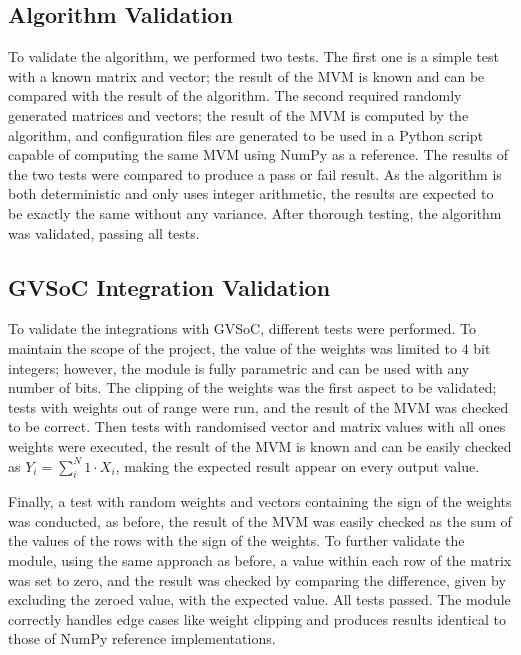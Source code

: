 \subsection{Algorithm Validation}\label{sec:alg_val}
To validate the algorithm, we performed two tests.
The first one is a simple test with a known matrix and vector; the result of the MVM is known and can be compared with the result of the algorithm.
The second required randomly generated matrices and vectors; the result of the MVM is computed by the algorithm, and configuration files are generated to be used in a Python script capable of computing the same MVM using NumPy as a reference.
The results of the two tests were compared to produce a pass or fail result.
As the algorithm is both deterministic and only uses integer arithmetic, the results are expected to be exactly the same without any variance.
After thorough testing, the algorithm was validated, passing all tests.

\subsection{GVSoC Integration Validation}\label{sec:gvsoc_val}
To validate the integrations with GVSoC, different tests were performed.
To maintain the scope of the project, the value of the weights was limited to $4$ bit integers; however, the module is fully parametric and can be used with any number of bits.
The clipping of the weights was the first aspect to be validated; tests with weights out of range were run, and the result of the MVM was checked to be correct.
Then tests with randomised vector and matrix values with all ones weights were executed, the result of the MVM is known and can be easily checked as $Y_i=\sum_{i}^{N}1\cdot X_i$, making the expected result appear on every output value.

Finally, a test with random weights and vectors containing the sign of the weights was conducted, as before, the result of the MVM was easily checked as the sum of the values of the rows with the sign of the weights.
To further validate the module, using the same approach as before, a value within each row of the matrix was set to zero, and the result was checked by comparing the difference, given by excluding the zeroed value, with the expected value.
All tests passed. The module correctly handles edge cases like weight clipping and produces results identical to those of NumPy reference implementations.

